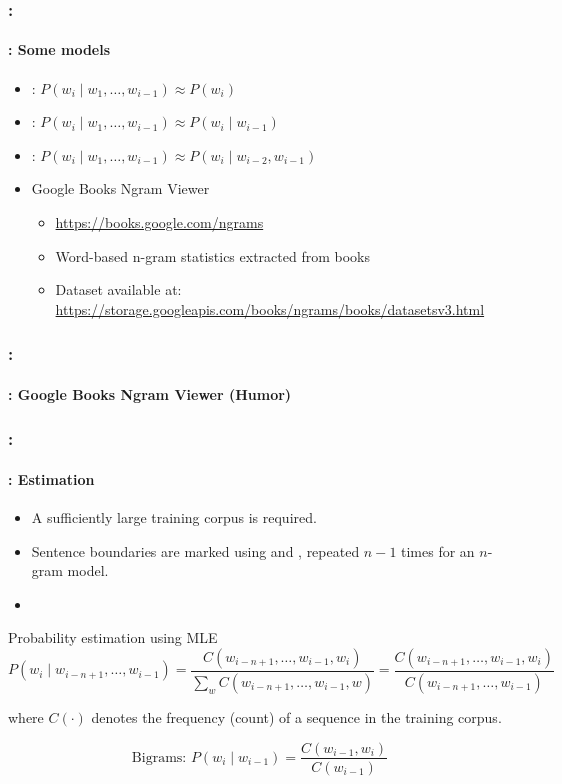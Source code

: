 \documentclass[xcolor=table]{beamer}
\begin{document}
\begin{frame}
	\frametitle{\insertshortsubtitle: \insertsection}
	\framesubtitle{\insertsubsection: Some models}
	
	\begin{itemize}
		\item {}: $P(w_i \mid w_1,\ldots, w_{i-1}) \approx P(w_i)$
		\item {}: $P(w_i \mid w_1,\ldots, w_{i-1}) \approx P(w_i \mid w_{i-1})$
		\item {}:  $P(w_i \mid w_1,\ldots, w_{i-1}) \approx P(w_i \mid w_{i-2}, w_{i-1})$
		\item Google Books Ngram Viewer
		\begin{itemize}
			\item \url{https://books.google.com/ngrams}
			\item Word-based n-gram statistics extracted from books
			\item Dataset available at: \url{https://storage.googleapis.com/books/ngrams/books/datasetsv3.html}
		\end{itemize}
	\end{itemize}
	

\end{frame}

\begin{frame}
	\frametitle{\insertshortsubtitle: \insertsection}
	\framesubtitle{\insertsubsection: Google Books Ngram Viewer (Humor)}

	\begin{center}
	\end{center}

\end{frame}

\begin{frame}
	\frametitle{\insertshortsubtitle: \insertsection}
	\framesubtitle{\insertsubsection: Estimation}
	
	\begin{itemize}
		\item A sufficiently large training corpus is required.
		\item Sentence boundaries are marked using  and , 
		repeated $n-1$ times for an $n$-gram model.
		\item {}
	\end{itemize}
	
	\begin{block}{Probability estimation using MLE}
		{\small \[
			P(w_i \mid w_{i-n+1}, \ldots, w_{i-1}) =
			\frac{C(w_{i-n+1}, \ldots, w_{i-1}, w_i)}
			{\sum_{w} C(w_{i-n+1}, \ldots, w_{i-1}, w)}
			=
			\frac{C(w_{i-n+1}, \ldots, w_{i-1}, w_i)}
			{C(w_{i-n+1}, \ldots, w_{i-1})}
			\]}
		
		where $C(\cdot)$ denotes the frequency (count) of a sequence in the training corpus.
		
		\[
		\text{Bigrams: } 
		P(w_i \mid w_{i-1}) = \frac{C(w_{i-1}, w_i)}{C(w_{i-1})}
		\]
	\end{block}
	
\end{frame}
\end{document}
